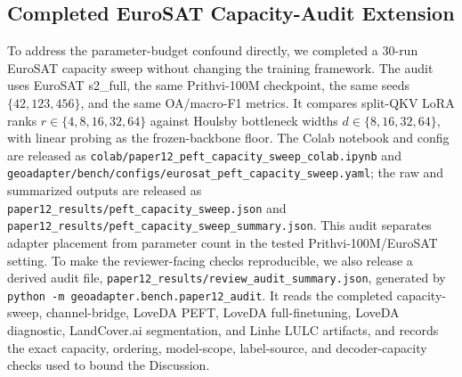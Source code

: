 \subsection{Completed EuroSAT Capacity-Audit Extension}
To address the parameter-budget confound directly, we completed a 30-run EuroSAT capacity sweep without changing the training framework. The audit uses EuroSAT s2\_full, the same Prithvi-100M checkpoint, the same seeds $\{42,123,456\}$, and the same OA/macro-F1 metrics. It compares split-QKV LoRA ranks $r\in\{4,8,16,32,64\}$ against Houlsby bottleneck widths $d\in\{8,16,32,64\}$, with linear probing as the frozen-backbone floor. The Colab notebook and config are released as \texttt{colab/paper12\_peft\_capacity\_sweep\_colab.ipynb} and \texttt{geoadapter/bench/configs/eurosat\_peft\_capacity\_sweep.yaml}; the raw and summarized outputs are released as \texttt{paper12\_results/peft\_capacity\_sweep.json} and \texttt{paper12\_results/peft\_capacity\_sweep\_summary.json}. This audit separates adapter placement from parameter count in the tested Prithvi-100M/EuroSAT setting. To make the reviewer-facing checks reproducible, we also release a derived audit file, \texttt{paper12\_results/review\_audit\_summary.json}, generated by \texttt{python -m geoadapter.bench.paper12\_audit}. It reads the completed capacity-sweep, channel-bridge, LoveDA PEFT, LoveDA full-finetuning, LoveDA diagnostic, LandCover.ai segmentation, and Linhe LULC artifacts, and records the exact capacity, ordering, model-scope, label-source, and decoder-capacity checks used to bound the Discussion.
